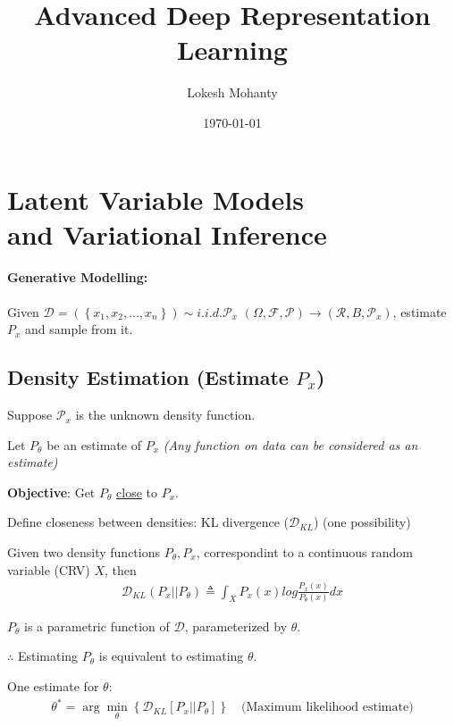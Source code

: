 \documentclass[11pt]{article}
\author{Lokesh Mohanty}
\date{\today}
\title{Advanced Deep Representation Learning}
\begin{document}
\maketitle
\tableofcontents

\clearpage
\section{Latent Variable Models \\and Variational Inference}
\label{sec:org1db23b0}

\paragraph{Generative Modelling:}
Given $\mathcal{D} = \left( \left\{ x_1, x_2, ..., x_n \right\} \right) \sim i.i.d. \mathcal{P}_x$
$\left( \Omega, \mathcal{F}, \mathcal{P} \right) \rightarrow \left( \mathcal{R}, B, \mathcal{P}_x \right)$,
estimate $P_x$ and sample from it.

\subsection{Density Estimation (Estimate $P_x$)} 
\label{sec:density-estimation}

Suppose $\mathcal{P}_x$ is the unknown density function.
\vspace{1em}

Let $P_{\theta}$ be an estimate of $P_x$
\textit{(Any function on data can be considered as an estimate)}
\vspace{1em}

\textbf{Objective}: Get $P_{\theta}$ \underline{close} to $P_x$.

Define closeness between densities: KL divergence ($\mathcal{D}_{KL}$) (one possibility)

Given two density functions $P_{\theta}, P_x$, correspondint to a continuous random variable (CRV) $X$, then
\begin{align*}
  \mathcal{D}_{KL}\left( P_x || P_{\theta} \right) \triangleq \int_X P_x(x) log \frac{P_x(x)}{P_{\theta}(x)} dx
\end{align*}

$P_{\theta}$ is a parametric function of $\mathcal{D}$, parameterized by $\theta$.

$\therefore$ Estimating $P_{\theta}$ is equivalent to estimating $\theta$.
\vspace{1em}

One estimate for $\theta$:
\begin{align*}
  \theta^{*} = \arg\min_{\theta} \left\{ \mathcal{D}_{KL} \left[ P_x || P_{\theta} \right] \right\} \quad\text{(Maximum likelihood estimate)}
\end{align*}
\vspace{1em}
\end{document}
